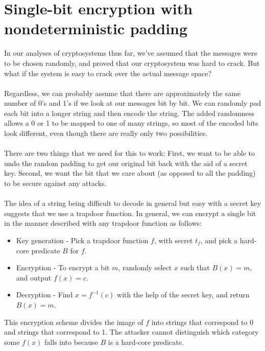 \documentclass[10pt]{article}
\begin{document}
\section{Single-bit encryption with nondeterministic padding}
In our analyses of cryptosystems thus far, we've assumed that the messages were to be chosen randomly, and proved that our cryptosystem was hard to crack.  But what if the system is easy to crack over the actual message space?
\\ ~ \\
Regardless, we can probably assume that there are approximately the same number of 0's and 1's if we look at our messages bit by bit.  We can randomly pad each bit into a longer string and then encode the string.  The added randomness allows a 0 or 1 to be mapped to one of many strings, so most of the encoded bits look different, even though there are really only two possibilities.
\\ ~ \\
There are two things that we need for this to work: First, we want to be able to undo the random padding to get our original bit back with the aid of a secret key.  Second, we want the bit that we care about (as opposed to all the padding) to be secure against any attacks.
\\ ~ \\
The idea of a string being difficult to decode in general but easy with a secret key suggests that we use a trapdoor function.  In general, we can encrypt a single bit in the manner described with any trapdoor function as follows:
\begin{itemize}
\item Key generation - Pick a trapdoor function $ f $, with secret $ t_f $, and pick a hard-core predicate $ B $ for $ f $.
\item Encryption - To encrypt a bit $ m $, randomly select $ x $ such that $ B(x) = m $, and output $ f(x) =  c $.
\item Decryption - Find $ x = f^{-1}(c) $ with the help of the secret key, and return $ B(x) = m $.
\end{itemize}
This encryption scheme divides the image of $ f $ into strings that correspond to 0 and strings that correspond to 1.  The attacker cannot distinguish which category some $ f(x) $ falls into because $ B $ is a hard-core predicate.
\end{document}
